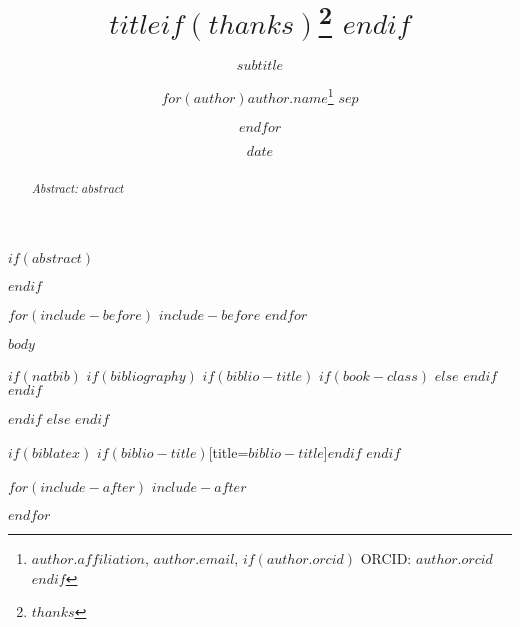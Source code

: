 \documentclass[11pt, a4paper, oneside]{memoir}
\title{$title$$if(thanks)$\thanks{$thanks$} $endif$ }
\subtitle{$subtitle$}
\author{$for(author)$$author.name$\thanks{$author.affiliation$,
    \texttt{$author.email$},
    $if(author.orcid)$ ORCID:
    \href{https://orcid.org/$author.orcid$}{$author.orcid$}$endif$}
  $sep$ \and $endfor$} $endif$
\institute{$for(author)$$author.affiliation$$sep$ \and $endfor$}
\date{$date$}
\begin{document}
\thispagestyle{empty}


\normalsize
\pagestyle{chroma}

$if(abstract)$
\begin{abstract}
\vspace*{-1.5cm}\noindent \emph{Abstract:} $abstract$
\end{abstract}
$endif$

$for(include-before)$
$include-before$
$endfor$

$body$

$if(natbib)$
  $if(bibliography)$
    $if(biblio-title)$
      $if(book-class)$
        \renewcommand\bibname{$biblio-title$}
      $else$
        \renewcommand\refname{$biblio-title$}
      $endif$
    $endif$
    
  $endif$
$else$
$endif$

$if(biblatex)$
\printbibliography$if(biblio-title)$[title=$biblio-title$]$endif$
$endif$

$for(include-after)$
$include-after$

$endfor$
\end{document}
